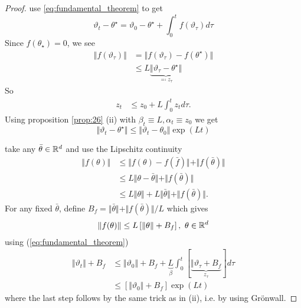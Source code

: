 \begin{proof}
     use \ref{eq:fundamental_theorem} to get 
    \[\vartheta_t-\theta^\star=\vartheta_0-\theta^\star+\int_0^tf(\vartheta_\tau)d\tau\]
    Since \(f(\theta_\star)=0\), we see 
    \begin{align*}
        \Vert f(\vartheta_\tau)\Vert &= \Vert f(\vartheta_\tau)-f(\theta^\star)\Vert\\
        &\leq L\underbrace{\Vert \vartheta_\tau-\theta^\star\Vert}_{\eqqcolon z_\tau}
    \end{align*}
    So 
    \begin{align*}
        z_t&\leq z_0+L \int_0^t z_t d\tau.
    \end{align*}
    Using proposition \ref{prop:26} (ii) with \(\beta_t\equiv L,\alpha_t\equiv z_0\)
    we get \[\Vert \vartheta_t-\theta^\star\Vert\leq \Vert \vartheta_t-\theta_0\Vert\exp(Lt)\]
    
     take any \(\bar{\theta}\in\mathbb{R}^d\) and use the Lipschitz continuity 
    \begin{align*}
        \Vert f(\theta)\Vert &\leq \Vert f(\theta)-f(\bar{f})\Vert +\Vert f(\bar{\theta})\Vert \\
        &\leq L\Vert \theta-\bar{\theta}\Vert + \Vert f(\bar{\theta})\Vert \\
        &\leq L\Vert \theta\Vert + L\Vert \bar{\theta}\Vert + \Vert f(\bar\theta)\Vert.
    \end{align*} 
    For any fixed \(\bar{\theta}\), define \(B_f=\Vert \bar{\theta}\Vert + \Vert f(\bar\theta)\Vert/L\)
    which gives 
    \begin{align*}
        \Vert f(\theta)\Vert \leq L \left[\Vert \theta\Vert + B_f\right],\ \theta\in\mathbb{R}^d
    \end{align*}
    using (\ref{eq:fundamental_theorem})
    \begin{align*}
        \Vert \vartheta_t\Vert +B_f &\leq \Vert \vartheta_0\Vert + B_f +\underbrace{L}_\beta\int_0^t \left[\underbrace{\Vert\vartheta_\tau+ B_f}_{z_\tau}\right]d\tau\\
        &\leq \left[\Vert \vartheta_0\Vert +B_f\right]\exp(Lt) 
    \end{align*}
    where the last step follows by the same trick as in (ii), i.e. by using Grönwall.
\end{proof}

